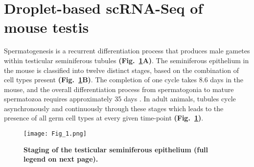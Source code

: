
\section{Droplet-based scRNA-Seq of mouse testis}
\label{sec3:clustering}

Spermatogenesis is a recurrent differentiation process that produces male gametes within testicular seminiferous tubules \textbf{(Fig.~\ref{fig3:cell_staging}A)}. The seminiferous epithelium in the mouse is classified into twelve distinct stages, based on the combination of cell types present \textbf{(Fig.~\ref{fig3:cell_staging}B)}. The completion of one cycle takes 8.6 days in the mouse, and the overall differentiation process from spermatogonia to mature spermatozoa requires approximately 35 days \citep{Oakberg1956a}. In adult animals, tubules cycle asynchronously and continuously through these stages which leads to the presence of all germ cell types at every given time-point \textbf{(Fig.~\ref{fig3:cell_staging})}. 

\begin{figure}[!h]
\centering
\texttt{[image: Fig\_1.png]}
\caption[Staging of the testicular seminiferous epithelium]{\textbf{Staging of the testicular seminiferous epithelium (full legend on next page).}\\}
\label{fig3:cell_staging}
\end{figure}

\newpage

